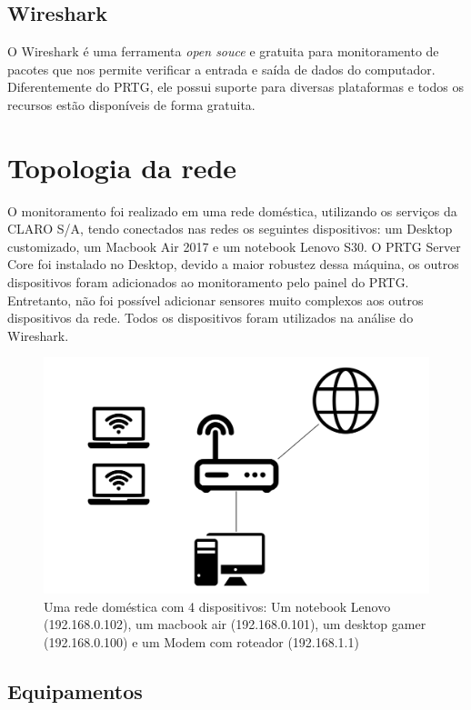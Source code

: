 \documentclass[12pt]{article}
\begin{document}
\subsection{Wireshark}

O Wireshark é uma ferramenta \emph{open souce} e gratuita para monitoramento de pacotes que nos permite verificar a entrada e saída de dados do computador. Diferentemente do PRTG, ele possui suporte para diversas plataformas e todos os recursos estão disponíveis de forma gratuita.

\section{Topologia da rede}

O monitoramento foi realizado em uma rede doméstica, utilizando os serviços da CLARO S/A, tendo conectados nas redes os seguintes dispositivos: um Desktop customizado, um Macbook Air 2017 e um notebook Lenovo S30. O PRTG Server Core foi instalado no Desktop, devido a maior robustez dessa máquina, os outros dispositivos foram adicionados ao monitoramento pelo painel do PRTG. Entretanto, não foi possível adicionar sensores muito complexos aos outros dispositivos da rede. Todos os dispositivos foram utilizados na análise do Wireshark.

\begin{figure}[H]
    \includegraphics[width=\linewidth]{topology.png}
    \caption{Uma rede doméstica com 4 dispositivos: Um notebook Lenovo (192.168.0.102), um macbook air (192.168.0.101), um desktop gamer (192.168.0.100) e um Modem com roteador (192.168.1.1)}
\end{figure}

\subsection{Equipamentos}
\end{document}

